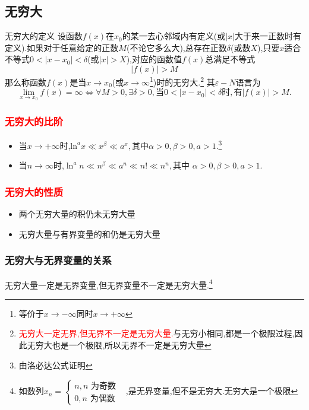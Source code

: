 \documentclass[8pt a4paper, oneside, UTF8]{ctexbook}
\begin{document}
\begin{sloppypar}
    \subsection{无穷大}
    \begin{defn}{无穷大的定义}{}
        设函数$f(x)$在$x_0$的某一去心邻域内有定义(或$|x|$大于来一正数时有定义).如果对于任意给定的正数$M$(不论它多么大),总存在正数$\delta$(或数$X$),只要$x$适合不等式$0<|x-x_0|<\delta$(或$|x|>X$),对应的函数值$f(x)$总满足不等式
        $$
            |f(x)|>M
        $$
        那么称函数$f(x)$是当$x\to x_0$(或$x\to\infty$\footnote{等价于$x \to -\infty$同时$x \to +\infty$})时的无穷大.\footnote{\textcolor{red}{无穷大一定无界,但无界不一定是无穷大量.}与无穷小相同,都是一个极限过程,因此无穷大也是一个极限,所以无界不一定是无穷大量}
        其$\varepsilon-N$语言为
        $$
            \lim\limits_{x\to x_0}f(x)= \infty \Leftrightarrow\forall M >0,\exists\delta>0,\text{当}0<|x-x_0|<\delta\text{时},\text{有}|f(x)|>M.
        $$
    \end{defn}
    \subsubsection{\textcolor{red}{无穷大的比阶}}
    \begin{itemize}
        \item 当$x \to +\infty$时,$\mathrm{ln}^ax\ll x^\beta\ll a^x,\text{其中}\alpha>0,\beta>0,a>1.$\footnote{由洛必达公式证明}
        \item 当$n \to \infty$时,$\ln^an\ll n^\beta\ll a^n\ll n!\ll n^n,\text{其中 }\alpha>0,\beta>0,a>1.$
    \end{itemize}
    \subsubsection{\textcolor{red}{无穷大的性质}}
    \begin{itemize}
        \item 两个无穷大量的积仍未无穷大量
        \item 无穷大量与有界变量的和仍是无穷大量
    \end{itemize}
    \subsubsection{无穷大与无界变量的关系}
    无穷大量一定是无界变量,但无界变量不一定是无穷大量.\footnote{如数列$x_n=\begin{cases}n,n\text{ 为奇数}\\0,n\text{ 为偶数}&\end{cases}$,是无界变量,但不是无穷大.无穷大是一个极限}

\end{sloppypar}
\end{document}
